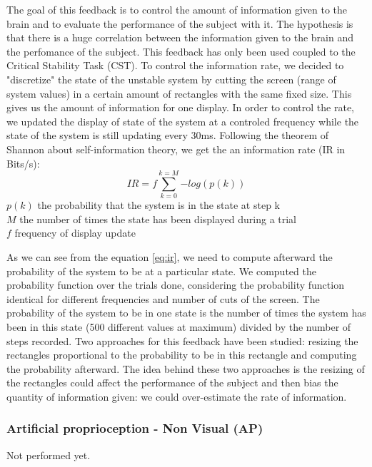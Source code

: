 \documentclass[preprint,12pt]{elsarticle}
\begin{document}
The goal of this feedback is to control the amount of information given to the brain and to evaluate the performance of the subject with it. The hypothesis is that there is a huge correlation between the information given to the brain and the perfomance of the subject. This feedback has only been used coupled to the Critical Stability Task (CST). To control the information rate, we decided to "discretize" the state of the unstable system by cutting the screen (range of system values) in a certain amount of rectangles with the same fixed size. This gives us the amount of information for one display. In order to control the rate, we updated the display of state of the system at a controled frequency while the state of the system is still updating every 30ms. Following the theorem of Shannon about self-information theory, we get the an information rate (IR in Bits/s):
\begin{equation} 
IR = f\sum_{k=0}^{k=M}{-log(p(k))}
\label{eq:ir}
\end{equation}
$p(k)$ the probability that the system is in the state at step k\\
$M$ the number of times the state has been displayed during a trial\\
$f$ frequency of display update

As we can see from the equation \ref{eq:ir}, we need to compute afterward the probability of the system to be at a particular state. We computed the probability function over the trials done, considering the probability function identical for different frequencies and number of cuts of the screen. The probability of the system to be in one state is the number of times the system has been in this state (500 different values at maximum) divided by the number of steps recorded. Two approaches for this feedback have been studied: resizing the rectangles proportional to the probability to be in this rectangle and computing the probability afterward. The idea behind these two approaches is the resizing of the rectangles could affect the performance of the subject and then bias the quantity of information given: we could over-estimate the rate of information.

\subsubsection{Artificial proprioception - Non Visual (AP)}
Not performed yet.
\end{document}
